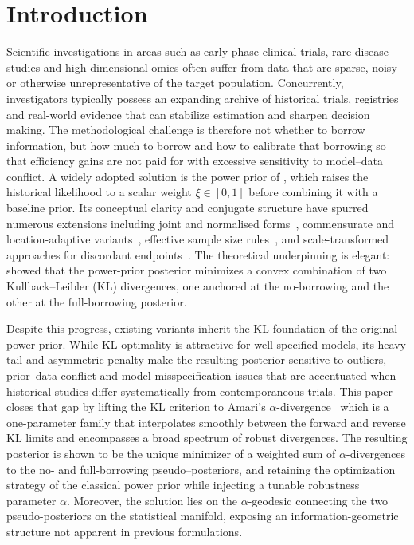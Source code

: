 \documentclass[12pt]{article}
\begin{document}
\section{Introduction}
\label{sec:introduction}
Scientific investigations in areas such as early-phase
clinical trials, rare-disease studies and high-dimensional omics often suffer from data that are sparse, noisy or otherwise unrepresentative of the target population.
Concurrently, investigators typically possess an expanding archive of historical trials, registries and real-world evidence that can stabilize estimation and sharpen decision making.
The methodological challenge is therefore not whether to borrow information, but how much to borrow and how to calibrate that borrowing so that efficiency gains are not paid for with excessive sensitivity to model–data conflict.
A widely adopted solution is the power prior of \citet{ibrahim2000power}, which raises the historical likelihood to a scalar weight $\xi\in[0,1]$ before combining it with a baseline prior.
Its conceptual clarity and conjugate structure have spurred numerous extensions including joint and normalised forms~\citep{chen2000power,duan2006evaluating}, commensurate and location-adaptive variants~\citep{hobbs2011hierarchical}, effective sample size rules~\citep{ollier2020adaptive}, and scale-transformed approaches for discordant endpoints~\citep{alt2023scale}.
The theoretical underpinning is elegant:
\citet{Ibrahim01032003} showed that the power-prior
posterior minimizes a convex combination of two
Kullback–Leibler (KL) divergences, one anchored at the
no-borrowing and the other at the full-borrowing posterior.


Despite this progress, existing variants inherit the KL foundation of the original power prior.
While KL optimality is attractive for well-specified models, its heavy tail and asymmetric penalty make the resulting posterior sensitive to outliers, prior–data conflict and model misspecification issues that are accentuated when historical studies differ systematically from contemporaneous trials.
This paper closes that gap by lifting the KL criterion to Amari's $\alpha$-divergence~\citep{amari2009alpha} which is a one-parameter family that interpolates smoothly between the forward and reverse KL limits and encompasses a broad spectrum of robust divergences.
The resulting posterior is shown to be the unique minimizer of a weighted sum of $\alpha$-divergences to the no- and full-borrowing pseudo–posteriors, and retaining the optimization strategy of the classical power prior while injecting a tunable robustness parameter $\alpha$.
Moreover, the solution lies on the
$\alpha$-geodesic connecting the two pseudo-posteriors on the statistical manifold, exposing an information-geometric structure not apparent in previous formulations.
\end{document}

